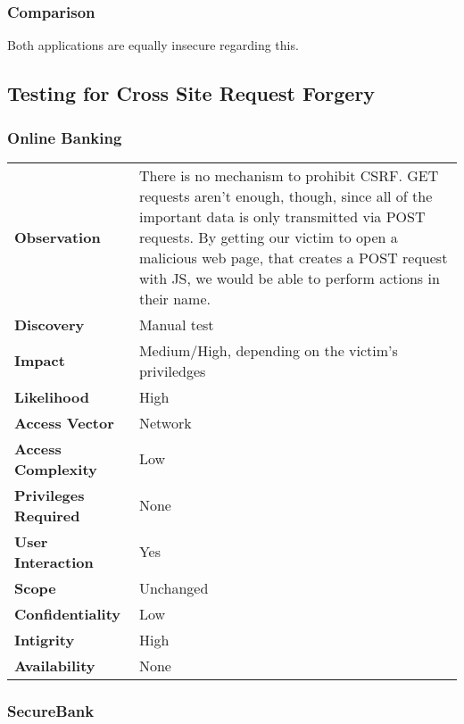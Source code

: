 \subsubsection*{Comparison}
Both applications are equally insecure regarding this.

\clearpage


\subsection{Testing for Cross Site Request Forgery}

\subsubsection*{Online Banking}

\begin{tabular}{l|p{10cm}}
\textbf{Observation} & There is no mechanism to prohibit CSRF. GET requests aren't enough, though, since all of the important data is only transmitted via POST requests. By getting our victim to open a malicious web page, that creates a POST request with JS, we would be able to perform actions in their name. \\
\textbf{Discovery} & Manual test \\
\textbf{Impact} & Medium/High, depending on the victim's priviledges \\
\textbf{Likelihood} & High \\
\textbf{Access Vector} & Network \\
\textbf{Access Complexity} & Low\\
\textbf{Privileges Required} & None \\
\textbf{User Interaction} & Yes \\
\textbf{Scope} & Unchanged \\
\textbf{Confidentiality} & Low \\
\textbf{Intigrity} & High\\
\textbf{Availability} & None \\
\end{tabular}

\subsubsection*{SecureBank}

